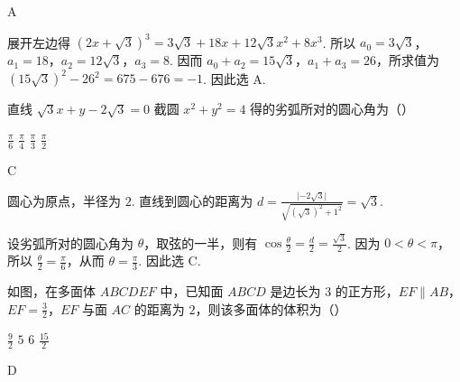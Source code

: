\begin{answer}
A
\end{answer}

\begin{solution}
展开左边得
\((2x+\sqrt3)^3=3\sqrt3+18x+12\sqrt3x^2+8x^3\).
所以 \(a_0=3\sqrt3\)，\(a_1=18\)，\(a_2=12\sqrt3\)，\(a_3=8\). 因而
\(a_0+a_2=15\sqrt3\)，\(a_1+a_3=26\)，所求值为
\((15\sqrt3)^2-26^2=675-676=-1\).
因此选 A.
\end{solution}

\begin{problem}
直线 \(\sqrt{3}x+y-2\sqrt{3}=0\) 截圆 \(x^2+y^2=4\) 得的劣弧所对的圆心角为（\quad）

\choices
    {\(\frac{\pi}{6}\)}
    {\(\frac{\pi}{4} \)}
    {\(\frac{\pi}{3} \)}
    {\(\frac{\pi}{2} \)}
\end{problem}

\begin{answer}
C
\end{answer}

\begin{solution}
圆心为原点，半径为 \(2\). 直线到圆心的距离为
\(d=\frac{\lvert-2\sqrt3\rvert}{\sqrt{(\sqrt3)^2+1^2}}=\sqrt3\).

设劣弧所对的圆心角为 \(\theta\)，取弦的一半，则有
\(\cos\frac\theta2=\frac d2=\frac{\sqrt3}{2}\). 因为 \(0<\theta<\pi\)，所以 \(\frac\theta2=\frac\pi6\)，从而 \(\theta=\frac\pi3\). 因此选 C.
\end{solution}

\begin{problem}
如图，在多面体 \(ABCDEF\) 中，已知面 \(ABCD\) 是边长为 \(3\) 的正方形，\(EF\parallel AB\)，\(EF = \frac{3}{2}\)，\(EF\) 与面 \(AC\) 的距离为 \(2\)，则该多面体的体积为（\quad）


\choices
    {\(\frac{9}{2}\)}
    {\(5\)}
    {\(6\)}
    {\(\frac{15}{2}\)}
\end{problem}

\begin{answer}
D
\end{answer}

